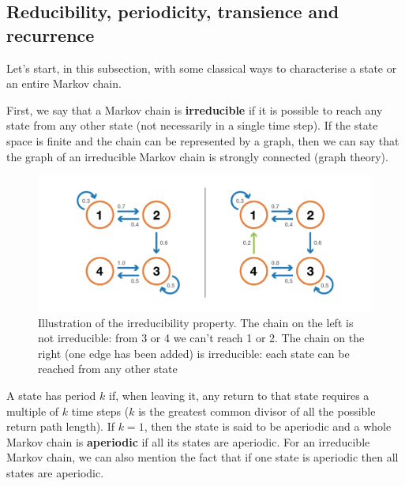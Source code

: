 \subsection{Reducibility, periodicity, transience and recurrence}
Let's start, in this subsection, with some classical ways to characterise a state or an entire Markov chain.

First, we say that a Markov chain is \textbf{irreducible} if it is possible to reach any state from any other state (not necessarily in a single time step). If the state space is finite and the chain can be represented by a graph, then we can say that the graph of an irreducible Markov chain is strongly connected (graph theory).

\begin{figure}[h]
    \centering
\includegraphics[width=\textwidth]{pic/p05c06-snip05.png}
    \caption[Illustration of the irreducibility property]{Illustration of the irreducibility property. The chain on the left is not irreducible: from 3 or 4 we can't reach 1 or 2. The chain on the right (one edge has been added) is irreducible: each state can be reached from any other state}
    \label{fig:p05c06-snip05}
\end{figure}


A state has period $k$ if, when leaving it, any return to that state requires a multiple of $k$ time steps ($k$ is the greatest common divisor of all the possible return path length). If $k = 1$, then the state is said to be aperiodic and a whole Markov chain is \textbf{aperiodic} if all its states are aperiodic. For an irreducible Markov chain, we can also mention the fact that if one state is aperiodic then all states are aperiodic.



